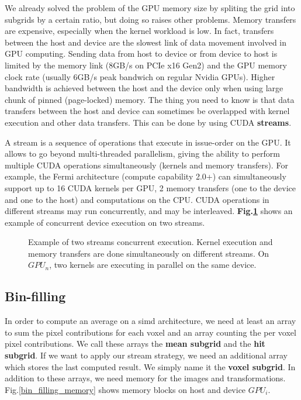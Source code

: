 \documentclass[12pt,journal,compsoc]{IEEEtran}
\begin{document}
We already solved the problem of the GPU memory size by spliting the grid into subgrids by a certain ratio, but doing so raises other problems.
Memory transfers are expensive, especially when the kernel workload is low.
In fact, transfers between the host and device are the slowest link of data movement involved in GPU computing.
Sending data from host to device or from device to host is limited by the memory link (8GB/s on PCIe x16 Gen2) and the GPU memory clock rate (usually 6GB/s peak bandwich on regular Nvidia GPUs).
Higher bandwidth is achieved between the host and the device only when using large chunk of pinned (page-locked) memory.
The thing you need to know is that data transfers between the host and device can sometimes be overlapped with kernel execution and other data transfers.
This can be done by using CUDA \textbf{streams}.\par
A stream is a sequence of operations that execute in issue-order on the GPU.
It allows to go beyond multi-threaded parallelism, giving the ability to perform multiple CUDA operations simultaneously (kernels and memory transfers).
For example, the Fermi architecture (compute capability 2.0+) can simultaneously support up to 16 CUDA kernels per GPU, 2 memory transfers (one to the device and one to the host) and computations on the CPU.
CUDA operations in different streams may run concurrently, and may be interleaved. \textbf{Fig.\ref{basic_streams}} shows an example of concurrent device execution on two streams.

\begin{figure}[!t]
\centering
{}
\caption{Example of two streams concurrent execution. Kernel execution and memory transfers are done simultaneously on different streams. On $GPU_n$, two kernels are executing in parallel on the same device.}
\label{basic_streams}
\end{figure}

\subsection{Bin-filling}
In order to compute an average on a \ac{simd} architecture, we need at least an array to sum the pixel contributions for each voxel and an array counting the per voxel pixel contributions.
We call these arrays the \textbf{mean subgrid} and the \textbf{hit subgrid}.
If we want to apply our stream strategy, we need an additional array which stores the last computed result.
We simply name it the \textbf{voxel subgrid}. 
In addition to these arrays, we need memory for the images and transformations.
Fig.\ref{bin_filling_memory} shows memory blocks on host and device $GPU_i$.
\end{document}
